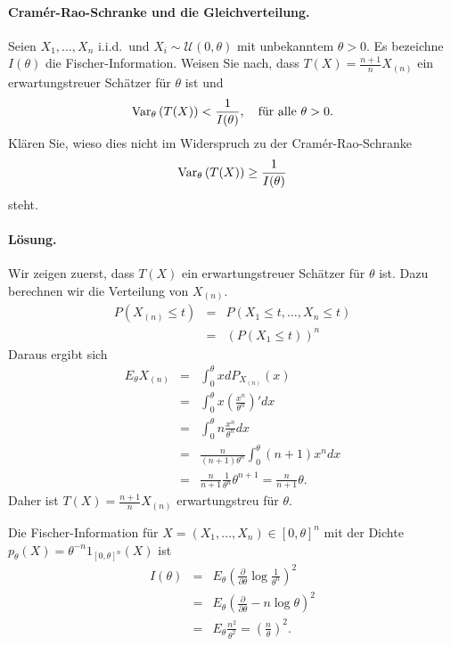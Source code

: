 \paragraph{Cram\'er-Rao-Schranke und die Gleichverteilung.}   %
Seien $X_1,\ldots,X_n$ i.i.d.\ und $X_i \sim \mathcal U(0,\theta)$ mit unbekanntem 
$\theta > 0$. Es bezeichne $I(\theta)$ die Fischer-Information. Weisen Sie nach, dass
$T(X)=\frac{n+1}{n}X_{(n)}$ ein erwartungstreuer Schätzer für $\theta$ ist und
\begin{equation}
	\operatorname{Var}_\theta \left( T(X) \right) < \frac{1}{I(\theta)}, \quad \textrm{für alle } \theta>0. 
\end{equation}
Klären Sie, wieso dies nicht im Widerspruch zu der Cram\'er-Rao-Schranke
\begin{equation}
	\operatorname{Var}_\theta\left( T(X) \right) \geq \frac{1}{I(\theta)}
\end{equation}
steht.

\paragraph*{Lösung. } Wir zeigen zuerst, dass $T(X)$ ein erwartungstreuer Schätzer
für $\theta$ ist. Dazu berechnen wir die Verteilung von $X_{(n)}$.
\begin{eqnarray}
    P\left( X_{(n)} \leq t \right) &=& P\left( X_1\leq t,\ldots, X_n\leq t \right) \\
    &=& \left( P(X_1 \leq t) \right)^n
\end{eqnarray}
Daraus ergibt sich
\begin{eqnarray}
    E_\theta X_{(n)} &=& \int_{0}^{\theta} x dP_{ X_{(n)} }(x) \\
    &=& \int_{0}^{\theta} x \left( \frac{x^n}{\theta^n} \right)' dx \\
    &=& \int_{0}^{\theta} n \frac{x^n}{\theta^n} dx \\
    &=& \frac{n}{(n+1)\theta^n} \int_{0}^{\theta} (n+1)x^n dx \\
    &=& \frac{n}{n+1} \frac{1}{\theta^n} \theta^{n+1} = \frac{n}{n+1} \theta.
\end{eqnarray}
Daher ist $T(X) = \frac{n+1}{n} X_{(n)}$ erwartungstreu für $\theta$.

Die Fischer-Information für $X=(X_1,\ldots,X_n)\in [0,\theta]^n$ mit der Dichte
$p_\theta(X) = \theta^{-n} 1_{[0,\theta]^n}(X)$ ist 
\begin{eqnarray}
    I(\theta) &=& E_\theta\left( \frac{\partial}{\partial \theta} \log \frac{1}{\theta^n} \right)^2 \\
    &=& E_\theta \left( \frac{\partial}{\partial \theta} -n \log \theta \right)^2 \\
    &=& E_\theta \frac{n^2}{\theta^2} = \left( \frac{n}{\theta} \right)^2.
\end{eqnarray}

